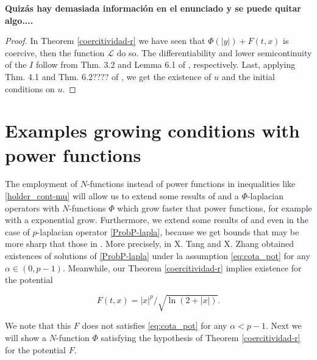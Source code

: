 \documentclass[twoside]{article}
\theoremstyle{remark}
\begin{document}
{\bf Quiz\'as hay demasiada informaci\'on en el enunciado y se puede quitar algo....}

\begin{proof}
In Theorem \ref{coercitividad-r} we have seen that $\Phi\left(|y|\right)+ F(t,x)$ is coercive, 
then the function $\mathcal L$ do so. The  differentiability and lower semicontinuity of the $I$ follow from  
Thm. 3.2  and Lemma 6.1 of \cite{ABGMS2015}, respectively. 
Last, applying Thm. 4.1 and Thm. 6.2???? of \cite{ABGMS2015}, we get the existence of $u$ 
and the initial conditions on $u$. 
\end{proof}



 \section{Examples growing conditions with power functions}


 The employment of  $N$-functions instead of power functions in  inequalities like  \eqref{holder_cont-mu}  will allow us to extend some results of   \cite{tang1998periodic} and \cite{tang2010periodic}  a $\Phi$-laplacian operators with $N$-functions $\Phi$ which grow faster that power functions, for example with a exponential grow. Furthermore, we  extend some results of   \cite{tang1998periodic} and \cite{tang2010periodic} even in the case of  $p$-laplacian operator \eqref{ProbP-lapla}, because
 we get bounds that may be more sharp that those in \cite{tang1998periodic,tang2010periodic}. More precisely, in  \cite[Th. 2.1]{tang2010periodic} X. Tang and X. Zhang obtained existences of solutions of \eqref{ProbP-lapla} under la assumption \eqref{eq:cota_pot}
 for any $\alpha\in (0,p-1)$. Meanwhile, our Theorem \ref{coercitividad-r} implies existence for the potential

 \[F(t,x)=|x|^p/\sqrt{\ln(2+|x|)}.\]

 We note that this $F$ does not satisfies \eqref{eq:cota_pot} for any $\alpha<p-1$.  Next we will show  a $N$-function $\Phi$ satisfying the hypothesis of Theorem \ref{coercitividad-r} for the potential $F$.
\end{document}
